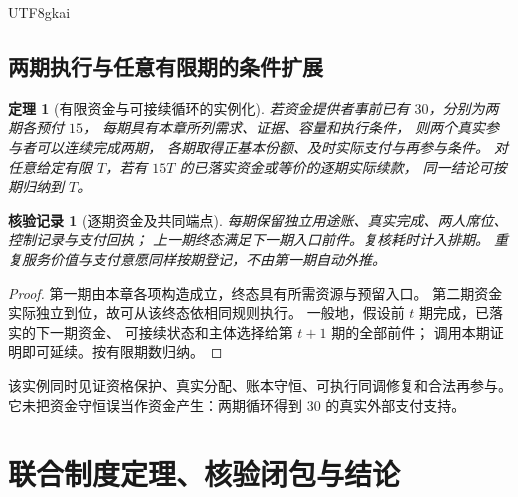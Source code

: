 \documentclass[12pt,a4paper,openany]{report}
\newtheorem{theorem}{定理}[chapter]
\newtheorem{Certificate}{核验记录}[chapter]
\begin{document}
\begin{CJK*}{UTF8}{gkai}
\section{两期执行与任意有限期的条件扩展}
\begin{theorem}[有限资金与可接续循环的实例化]
\label{thm:example-finite}
若资金提供者事前已有 \(30\)，分别为两期各预付 \(15\)，
每期具有本章所列需求、证据、容量和执行条件，
则两个真实参与者可以连续完成两期，
各期取得正基本份额、及时实际支付与再参与条件。
对任意给定有限 \(T\)，若有 \(15T\) 的已落实资金或等价的逐期实际续款，
同一结论可按期归纳到 \(T\)。
\end{theorem}
\begin{Certificate}[逐期资金及共同端点]
每期保留独立用途账、真实完成、两人席位、控制记录与支付回执；
上一期终态满足下一期入口前件。复核耗时计入排期。
重复服务价值与支付意愿同样按期登记，不由第一期自动外推。
\end{Certificate}
\begin{proof}
第一期由本章各项构造成立，终态具有所需资源与预留入口。
第二期资金实际独立到位，故可从该终态依相同规则执行。
一般地，假设前 \(t\) 期完成，已落实的下一期资金、
可接续状态和主体选择给第 \(t+1\) 期的全部前件；
调用本期证明即可延续。按有限期数归纳。
\end{proof}

该实例同时见证资格保护、真实分配、账本守恒、可执行同调修复和合法再参与。
它未把资金守恒误当作资金产生：两期循环得到 \(30\) 的真实外部支付支持。

\chapter{联合制度定理、核验闭包与结论}
\label{ch:joint}


\end{CJK*}
\end{document}

